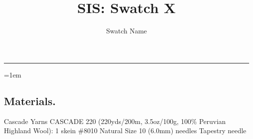 \documentclass{mhk-sis}
\title{SIS: Swatch X\vspace{-0.2em}}
\subtitle{Swatch Name}
\begin{document}
\maketitle
\hrule
\vspace*{\baselineskip}
\emergencystretch=1em

\subsection*{Materials.}

Cascade Yarns CASCADE 220 (220yds/200m, 3.5oz/100g, 100\% Peruvian Highland Wool): 1 skein \#8010 Natural
\newline Size 10 (6.0mm) needles
\newline Tapestry needle





 
\end{document}
